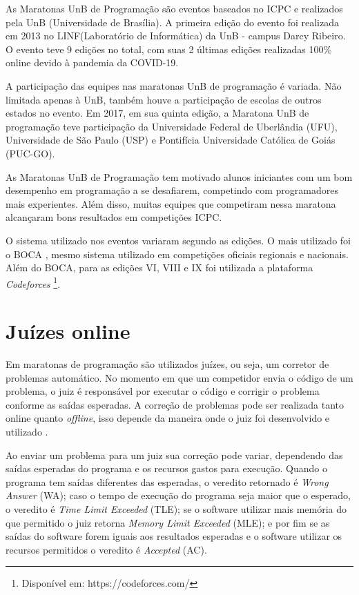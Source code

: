 As Maratonas UnB de Programação são eventos baseados no ICPC e realizados pela UnB (Universidade de Brasília). A primeira edição do evento foi realizada em 2013 no LINF(Laboratório de Informática) da UnB - campus Darcy Ribeiro. O evento teve 9 edições no total, com suas 2 últimas edições realizadas 100\% online devido à pandemia da COVID-19.

A participação das equipes nas maratonas UnB de programação é variada. Não limitada apenas à UnB, também houve a participação de escolas de outros estados no evento. Em 2017, em sua quinta edição, a Maratona UnB de programação teve participação da Universidade Federal de Uberlândia (UFU), Universidade de São Paulo (USP) e Pontifícia Universidade Católica de Goiás (PUC-GO). 

As Maratonas UnB de Programação tem motivado alunos iniciantes com um bom desempenho em programação a se desafiarem, competindo com programadores mais experientes. Além disso, muitas equipes que competiram nessa maratona alcançaram bons resultados em competições ICPC.

O sistema utilizado nos eventos variaram segundo as edições. O mais utilizado foi o BOCA \cite{de2004boca}, mesmo sistema utilizado em competições oficiais regionais e nacionais. Além do BOCA, para as edições VI, VIII e IX foi utilizada a plataforma \textit{Codeforces} \footnote{Disponível em: https://codeforces.com/}.

\section{Juízes online}
\label{sec:juizesOnline}

Em maratonas de programação são utilizados juízes, ou seja, um corretor de problemas automático. No momento em que um competidor envia o código de um problema, o juiz é responsável por executar o código e corrigir o problema conforme as saídas esperadas. A correção de problemas pode ser realizada tanto online quanto \textit{offline}, isso depende da maneira onde o juiz foi desenvolvido e utilizado \cite{KURNIA2001299}.

Ao enviar um problema para um juiz sua correção pode variar, dependendo das saídas esperadas do programa e os recursos gastos para execução. Quando o programa tem saídas diferentes das esperadas, o veredito retornado é \textit{Wrong Answer} (WA); caso o tempo de execução do programa seja maior que o esperado, o veredito é \textit{Time Limit Exceeded} (TLE); se o software utilizar mais memória do que permitido o juiz retorna \textit{Memory Limit Exceeded} (MLE); e por fim se as saídas do software forem iguais aos resultados esperadas e o software utilizar os recursos permitidos o veredito é \textit{Accepted} (AC).

